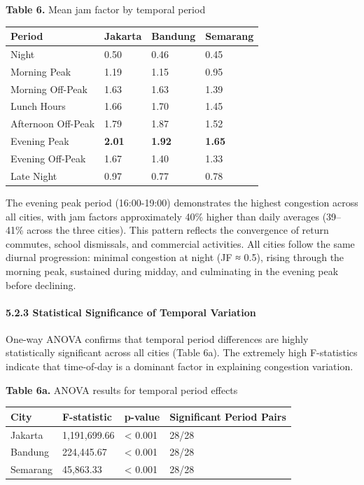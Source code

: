 \textbf{Table 6.} Mean jam factor by temporal period

\begin{longtable}[]{@{}llll@{}}
\toprule\noalign{}
Period & Jakarta & Bandung & Semarang \\
\midrule\noalign{}
\endhead
\bottomrule\noalign{}
\endlastfoot
Night & 0.50 & 0.46 & 0.45 \\
Morning Peak & 1.19 & 1.15 & 0.95 \\
Morning Off-Peak & 1.63 & 1.63 & 1.39 \\
Lunch Hours & 1.66 & 1.70 & 1.45 \\
Afternoon Off-Peak & 1.79 & 1.87 & 1.52 \\
Evening Peak & \textbf{2.01} & \textbf{1.92} & \textbf{1.65} \\
Evening Off-Peak & 1.67 & 1.40 & 1.33 \\
Late Night & 0.97 & 0.77 & 0.78 \\
\end{longtable}

The evening peak period (16:00-19:00) demonstrates the highest congestion across all cities, with jam factors approximately 40\% higher than daily averages (39--41\% across the three cities). This pattern reflects the convergence of return commutes, school dismissals, and commercial activities. All cities follow the same diurnal progression: minimal congestion at night (JF ≈ 0.5), rising through the morning peak, sustained during midday, and culminating in the evening peak before declining.

\paragraph{5.2.3 Statistical Significance of Temporal Variation}\label{statistical-significance-of-temporal-variation}

One-way ANOVA confirms that temporal period differences are highly statistically significant across all cities (Table 6a). The extremely high F-statistics indicate that time-of-day is a dominant factor in explaining congestion variation.

\textbf{Table 6a.} ANOVA results for temporal period effects

\begin{longtable}[]{@{}llll@{}}
\toprule\noalign{}
City & F-statistic & p-value & Significant Period Pairs \\
\midrule\noalign{}
\endhead
\bottomrule\noalign{}
\endlastfoot
Jakarta & 1,191,699.66 & \textless{} 0.001 & 28/28 \\
Bandung & 224,445.67 & \textless{} 0.001 & 28/28 \\
Semarang & 45,863.33 & \textless{} 0.001 & 28/28 \\
\end{longtable}

